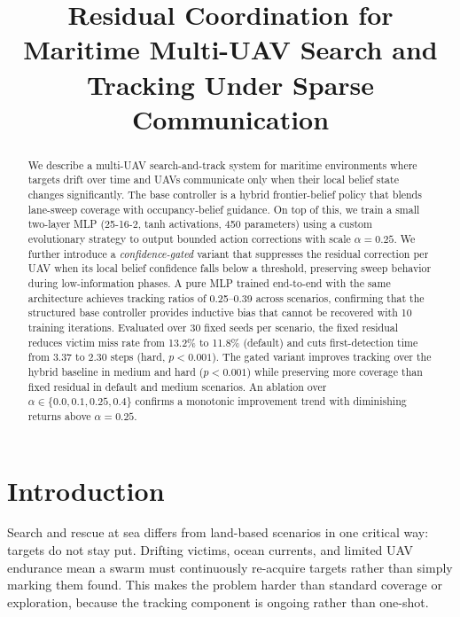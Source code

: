 \documentclass[conference]{IEEEtran}
\title{Residual Coordination for Maritime Multi-UAV Search and Tracking Under Sparse Communication}
\author{
\IEEEauthorblockN{Satish Kumar Mishra}
\IEEEauthorblockA{Netaji Subhas University of Technology, Delhi}
}
\begin{document}
\maketitle

\begin{abstract}
We describe a multi-UAV search-and-track system for maritime environments where targets
drift over time and UAVs communicate only when their local belief state changes
significantly. The base controller is a hybrid frontier-belief policy that blends
lane-sweep coverage with occupancy-belief guidance. On top of this, we train a small
two-layer MLP (25-16-2, tanh activations, 450 parameters) using a custom evolutionary
strategy to output bounded action corrections with scale $\alpha = 0.25$. We further
introduce a \emph{confidence-gated} variant that suppresses the residual correction
per UAV when its local belief confidence falls below a threshold, preserving sweep
behavior during low-information phases. A pure MLP trained end-to-end with the same
architecture achieves tracking ratios of 0.25--0.39 across scenarios, confirming that
the structured base controller provides inductive bias that cannot be recovered with
10 training iterations. Evaluated over 30 fixed seeds per scenario, the fixed residual
reduces victim miss rate from 13.2\% to 11.8\% (default) and cuts first-detection time
from 3.37 to 2.30 steps (hard, $p < 0.001$). The gated variant improves tracking over
the hybrid baseline in medium and hard ($p < 0.001$) while preserving more coverage
than fixed residual in default and medium scenarios. An ablation over $\alpha \in
\{0.0, 0.1, 0.25, 0.4\}$ confirms a monotonic improvement trend with diminishing
returns above $\alpha = 0.25$.
\end{abstract}

\section{Introduction}

Search and rescue at sea differs from land-based scenarios in one critical way: targets
do not stay put. Drifting victims, ocean currents, and limited UAV endurance mean a
swarm must continuously re-acquire targets rather than simply marking them found. This
makes the problem harder than standard coverage or exploration, because the tracking
component is ongoing rather than one-shot.
\end{document}
